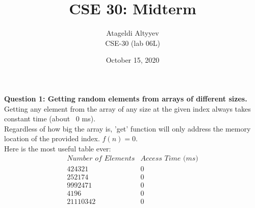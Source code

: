 \documentclass[11pt]{article}
\begin{document}
\author{Atageldi Altyyev\\
CSE-30 (lab 06L)}

\title{CSE 30: Midterm\\}

\date{October 15, 2020}
\maketitle


\textbf{Question 1: Getting random elements from arrays of different sizes.}
\\Getting any element from the array of any size at the given index always takes constant time (about ~0 ms).\\
Regardless of how big the array is, 'get' function will only address the memory location of the provided index. $f(n) = 0$.\\
Here is the most useful table ever:\\
\begin{displaymath}
\begin{array}{|c|c|}
\textit{Number of Elements} & \textit{Access Time (ms)}\\
\hline
 424321 & 0\\
 252174 & 0\\
 9992471 & 0\\
 4196 & 0\\
 21110342 & 0\\
\end{array}
\end{displaymath}
\end{document}
